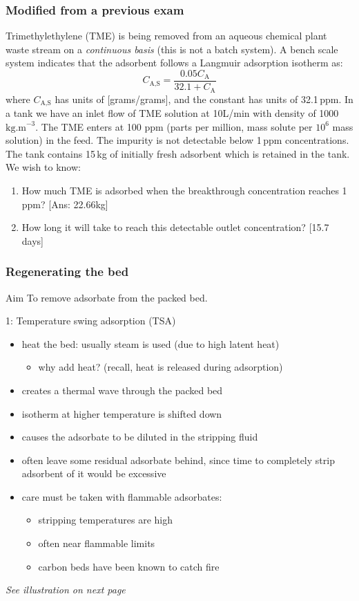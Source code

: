 \begin{frame}\frametitle{Modified from a previous exam}

	Trimethylethylene (TME) is being removed from an aqueous chemical plant waste stream on a \emph{continuous basis} (this is not a batch system). A bench scale system indicates that the adsorbent follows a Langmuir adsorption isotherm as:
	\[
		C_\text{A,S} = \frac{0.05C_\text{A}}{32.1 + C_\text{A}}
	\]
	where $C_\text{A,S}$ has units of [grams/grams], and the constant has units of 32.1\,ppm. In a tank we have an inlet flow of TME solution at 10L/min with density of 1000\,$\text{kg.m}^{-3}$. The TME enters at 100 ppm (parts per million, mass solute per $10^6$ mass solution) in the feed. The impurity is not detectable below 1\,ppm concentrations. The tank contains 15\,kg of initially fresh adsorbent which is retained in the tank. We wish to know:

	\begin{enumerate}
		\item	How much TME is adsorbed when the breakthrough concentration reaches 1 ppm? {\small\color{myOrange}[Ans: 22.66kg]}
		\item	How long it will take to reach this detectable outlet concentration? {\small\color{myOrange}[15.7 days]}
	\end{enumerate}
\end{frame}

\begin{frame}\frametitle{Regenerating the bed}
	\begin{exampleblock}{Aim}
		To remove adsorbate from the packed bed.
	\end{exampleblock}

	1: Temperature swing adsorption (TSA)
	\begin{itemize}
		\item	heat the bed: usually steam is used (due to high latent heat)
		\begin{itemize}
			\item	why add heat? (recall, heat is released during adsorption)
		\end{itemize}
		\item	creates a thermal wave through the packed bed
		\item	isotherm at higher temperature is shifted down
		\item	causes the adsorbate to be diluted in the stripping fluid
		\item	often leave some residual adsorbate behind, since time to completely strip adsorbent of it would be excessive
		\item	care must be taken with flammable adsorbates:
		\begin{itemize}
			\item	stripping temperatures are high
			\item	often near flammable limits
			\item	carbon beds have been known to catch fire
		\end{itemize}
	\end{itemize}
	\emph{See illustration on next page}
\end{frame}

